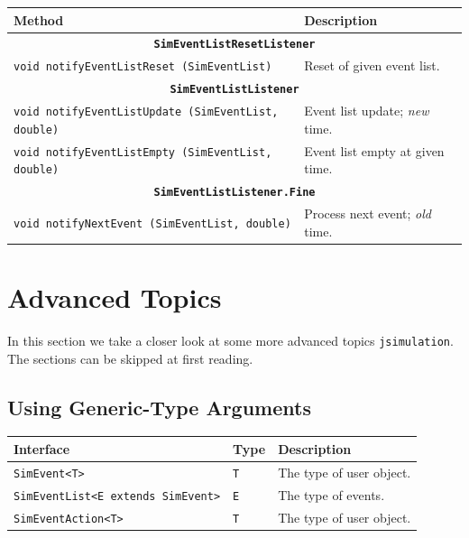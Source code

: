 \documentclass[12pt]{book}
\begin{document}
\begin{tabular}{|l|l|}
  \hline
  {\bf Method} & {\bf Description} \\
  \hline
  \multicolumn{2}{|c|}{\bf \lstinline[basicstyle=\small]{SimEventListResetListener}} \\
  \hline
  \lstinline[basicstyle=\footnotesize]!void notifyEventListReset (SimEventList)!
    & Reset of given event list. \\
  \hline
  \multicolumn{2}{|c|}{\bf \lstinline[basicstyle=\small]{SimEventListListener}} \\
  \hline
  \lstinline[basicstyle=\footnotesize]!void notifyEventListUpdate (SimEventList, double)!
    & Event list update; {\em new\/} time. \\
  \hline
  \lstinline[basicstyle=\footnotesize]!void notifyEventListEmpty (SimEventList, double)!
    & Event list empty at given time. \\
  \hline
  \multicolumn{2}{|c|}{\bf \lstinline[basicstyle=\small]{SimEventListListener.Fine}} \\
  \hline
  \lstinline[basicstyle=\footnotesize]!void notifyNextEvent (SimEventList, double)!
    & Process next event; {\em old\/} time. \\
  \hline
\end{tabular}

\section{Advanced Topics}

In this section we take a closer look at some more advanced topics
  \lstinline-jsimulation-.
The sections can be skipped at first reading.

\subsection{Using Generic-Type Arguments}

\begin{tabular}{|l|l|l|}
  \hline
  {\bf Interface} & {\bf Type} & Description \\
  \hline
  \lstinline|SimEvent<T>| & \lstinline|T| & The type of user object. \\
  \hline
  \lstinline|SimEventList<E extends SimEvent>| & \lstinline|E| & The type of events. \\
  \hline
  \lstinline|SimEventAction<T>| & \lstinline|T| & The type of user object. \\
  \hline
\end{tabular}
\end{document}
